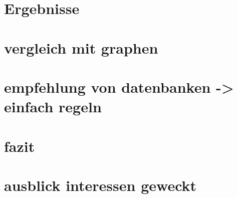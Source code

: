 \section{Ergebnisse}
\section{vergleich mit graphen}
\section{empfehlung von datenbanken -> einfach regeln}

\section{fazit}
\section{ausblick interessen geweckt}

% 
